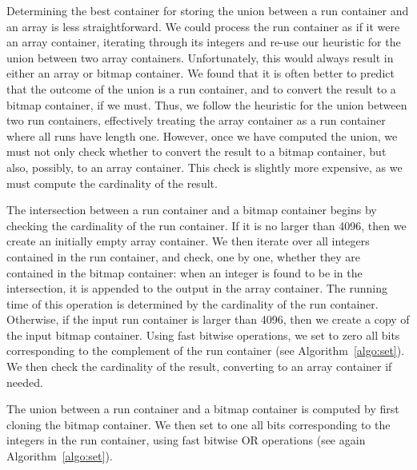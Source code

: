 \documentclass[times]{speauth}
\begin{document}
\begin{description}
Determining the best container for storing the  union between a run container and an array is
less straightforward. We could process the run container as if it were an array container, iterating through its integers and re-use our heuristic for the union between two array containers. Unfortunately, this would always result in either an array or bitmap container.
We found that it is often  better
to predict that the
outcome of the union is a run container, and to convert the result to a bitmap container, if we must. Thus, we follow the heuristic for the union between two run containers, effectively treating the array container as a run container where all runs have length one. However, once we have computed the union, we must not only check whether to convert the result to a bitmap container, but also, possibly, to an array container. This check is slightly more expensive, as we must compute the cardinality of the result.

\item [Run vs Bitmap:] The intersection between a run container and a
bitmap container begins by checking the cardinality of the run container. If it is no larger than \num{4096}, then we create an
initially empty array container. We then iterate over all integers
contained in the run container, and check, one by one, whether they
are contained in the bitmap container: when an integer is found to be in the intersection, it is appended to the output in the array container. The running time of this operation is determined by the cardinality of the run container. Otherwise, if the input run container is larger than \num{4096}, then we create a copy of
the input bitmap container. Using fast bitwise operations, we
set to zero all bits corresponding to the complement of the run container  (see Algorithm~\ref{algo:set}). We then check the cardinality of the result, converting to an array container if needed.

The union between a run container and a bitmap container is computed by first cloning the bitmap container. We then set to one all bits corresponding to the integers in the run container, using fast bitwise OR operations  (see again Algorithm~\ref{algo:set}).



\end{description}
\end{document}

